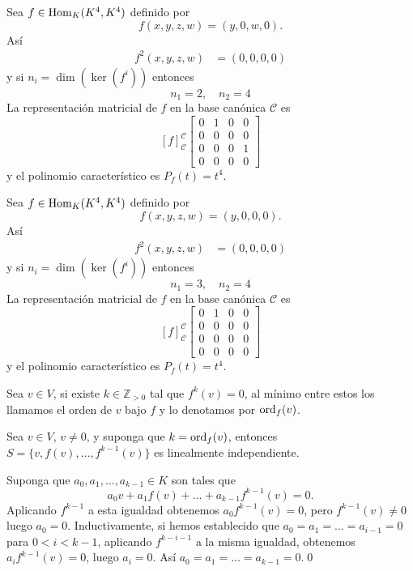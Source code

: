 \begin{ejem}\label{ejnil3}
Sea $f\in\operatorname{Hom}_K(K^4,K^4)$ definido por
$$f(x,y,z,w)=(y,0,w,0).$$
As\'i
\begin{align*}
f^2(x,y,z,w) & = (0,0,0,0)
\end{align*}
y si $n_i=\dim(\ker(f^i))$ entonces
$$n_1=2,\quad n_2=4$$
La representaci\'on matricial de $f$ en la base can\'onica $\mathcal{C}$ es
$$
\left[f\right]^{\mathcal{C}}_{\mathcal{C}}\left[\begin{array}{rr|rr}
0 & 1 & 0 & 0\\
0 & 0 & 0 & 0\\
\hline
0 & 0 & 0 & 1\\
0 & 0 & 0 & 0
\end{array}\right]
$$
y el polinomio caracter\'istico es $P_f(t)=t^4$.
\end{ejem}

\begin{ejem}\label{ejnil4}
Sea $f\in\operatorname{Hom}_K(K^4,K^4)$ definido por
$$f(x,y,z,w)=(y,0,0,0).$$
As\'i
\begin{align*}
f^2(x,y,z,w) & = (0,0,0,0)
\end{align*}
y si $n_i=\dim(\ker(f^i))$ entonces
$$n_1=3,\quad n_2=4$$
La representaci\'on matricial de $f$ en la base can\'onica $\mathcal{C}$ es
$$
\left[f\right]^{\mathcal{C}}_{\mathcal{C}}\left[\begin{array}{rr|r|r}
0 & 1 & 0 & 0\\
0 & 0 & 0 & 0\\
\hline
0 & 0 & 0 & 0\\
\hline
0 & 0 & 0 & 0
\end{array}\right]
$$
y el polinomio caracter\'istico es $P_f(t)=t^4$.
\end{ejem}

\begin{defn}
Sea $v\in V$, si existe $k\in\mathbb{Z}_{>0}$ tal que $f^k(v)=0$, al m\'inimo entre estos los llamamos el orden de $v$ bajo $f$ y lo denotamos por $\operatorname{ord}_f(v)$.
\end{defn}

\begin{pro}
Sea $v\in V$, $v\ne 0$, y suponga que $k=\operatorname{ord}_f(v)$, entonces $S=\{v,f(v),\ldots,f^{k-1}(v)\}$ es linealmente independiente.
\end{pro}

\dem Suponga que $a_0,a_1,\ldots,a_{k-1}\in K$ son tales que
\[
a_0v+a_1f(v)+\ldots+a_{k-1}f^{{k-1}}(v)=0.
\]
Aplicando $f^{k-1}$ a esta igualdad obtenemos $a_0f^{k-1}(v)=0$, pero $f^{k-1}(v)\ne 0$ luego $a_0=0$. Inductivamente, si hemos establecido que $a_0=a_1=\ldots=a_{i-1}=0$ para $0<i<k-1$, aplicando $f^{k-i-1}$ a la misma igualdad, obtenemos $a_if^{k-1}(v)=0$, luego $a_i=0$. As\'i $a_0=a_1=\ldots=a_{k-1}=0$.\qed

